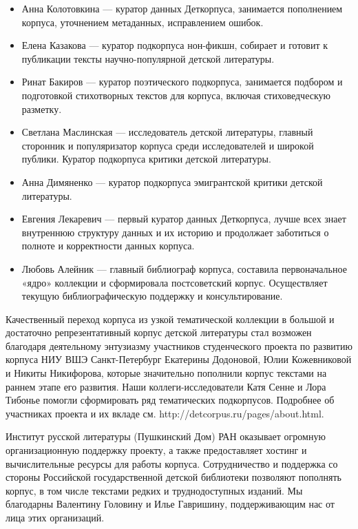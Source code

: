 \documentclass[
]{article}
\providecommand{\tightlist}{%
  \setlength{\itemsep}{0pt}\setlength{\parskip}{0pt}}
\begin{document}
\begin{itemize}
\tightlist
\item
  Анна Колотовкина --- куратор данных Деткорпуса, занимается пополнением
  корпуса, уточнением метаданных, исправлением ошибок.
\item
  Елена Казакова --- куратор подкорпуса нон-фикшн, собирает и готовит к
  публикации тексты научно-популярной детской литературы.
\item
  Ринат Бакиров --- куратор поэтического подкорпуса, занимается подбором
  и подготовкой стихотворных текстов для корпуса, включая стиховедческую
  разметку.
\item
  Светлана Маслинская --- исследователь детской литературы, главный
  сторонник и популяризатор корпуса среди исследователей и широкой
  публики. Куратор подкорпуса критики детской литературы.
\item
  Анна Димяненко --- куратор подкорпуса эмигрантской критики детской
  литературы.
\item
  Евгения Лекаревич --- первый куратор данных Деткорпуса, лучше всех
  знает внутреннюю структуру данных и их историю и продолжает заботиться
  о полноте и корректности данных корпуса.
\item
  Любовь Алейник --- главный библиограф корпуса, составила
  первоначальное «ядро» коллекции и сформировала постсоветский корпус.
  Осуществляет текущую библиографическую поддержку и консультирование.
\end{itemize}

Качественный переход корпуса из узкой тематической коллекции в большой и
достаточно репрезентативный корпус детской литературы стал возможен
благодаря деятельному энтузиазму участников студенческого проекта по
развитию корпуса НИУ ВШЭ Санкт-Петербург Екатерины Додоновой, Юлии
Кожевниковой и Никиты Никифорова, которые значительно пополнили корпус
текстами на раннем этапе его развития. Наши коллеги-исследователи Катя
Сенне и Лора Тибонье помогли сформировать ряд тематических подкорпусов.
Подробнее об участниках проекта и их вкладе см.
http://detcorpus.ru/pages/about.html.

Институт русской литературы (Пушкинский Дом) РАН оказывает огромную
организационную поддержку проекту, а также предоставляет хостинг и
вычислительные ресурсы для работы корпуса. Сотрудничество и поддержка со
стороны Российской государственной детской библиотеки позволяют
пополнять корпус, в том числе текстами редких и труднодоступных изданий.
Мы благодарны Валентину Головину и Илье Гавришину, поддерживающим нас от
лица этих организаций.
\end{document}
